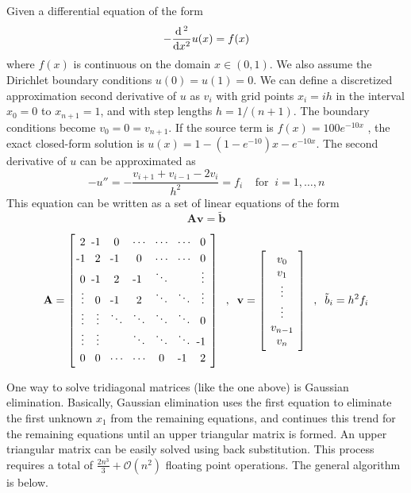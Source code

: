 \documentclass[11pt]{article}
\begin{document}
    Given a differential equation of the form 
    \begin{equation} - \dfrac{\dif\,^2}{\dif x^2} u(x) = f(x) \end{equation}
    where $f(x)$ is continuous on the domain $x \in (0,1)$. We also assume the Dirichlet boundary conditions $u(0)=u(1)=0$. We can define a discretized approximation second derivative of $u$ as $v_i$ with grid points $x_i=ih$ in the interval $x_0=0$ to $x_{n+1}=1$, and with step lengths $h=1/(n+1)$. The boundary conditions become $v_0 = 0 = v_{n+1}$. If the source term is $f(x) = 100e^{-10x}$ , the exact closed-form solution is $u(x) = 1−(1−e^{−10})x−e^{−10x}$. The second derivative of $u$ can be approximated as 
    \begin{equation} -u'' = -\dfrac{v_{i+1}+v_{i-1}-2v_i}{h^2} = f_i \;\;\;\; \text{for}\;\; i = 1,\dots,n \end{equation}
    This equation can be written as a set of linear equations of the form
    \begin{equation} \mathbf{Av} = \tilde{\mathbf{b}}  \end{equation}
    

    \[ \arraycolsep 1.0ex \mathbf{A} = \left[ \begin{array}{c c c c c c c} 
    \vspace{.1cm} 2 & \llap{-}1 & 0 & \cdots & \cdots & \cdots & 0 \\
    \llap{-}1 & 2 & \llap{-}1 & 0 & \cdots & \cdots & 0 \\
    0 & \llap{-}1 & 2 & \llap{-}1 & \ddots &  & \vdots \\
    \vdots & 0 & \llap{-}1 & 2 & \ddots & \ddots & \vdots \\
    \vdots & \vdots & \ddots &\ddots&\ddots&\ddots&0 \\
    \vdots &\vdots&&\ddots&\ddots&\ddots& \llap{-}1 \vspace{.1cm} \\ 
    0 &0&\cdots&\cdots&0&\llap{-}1& 2 
    \end{array} \right] \;\; , \;\; \bold{v} = \left[ \begin{array}{c} v_0 \\ v_1 \\ \vdots \\ \vdots \\ v_{n-1} \\ v_n \end{array} \right] \;\; , \;\; \tilde{b}_i = h^2 f_i \]

    One way to solve tridiagonal matrices (like the one above) is Gaussian elimination. Basically, Gaussian elimination uses the first equation to eliminate the first unknown $x_1$ from the remaining equations, and continues this trend for the remaining equations until an upper triangular matrix is formed. An upper triangular matrix can be easily solved using back substitution. This process requires a total of $\frac{2n^3}{3} + \mathcal{O}(n^2)$ floating point operations. The general algorithm is below.
    
\end{document}
